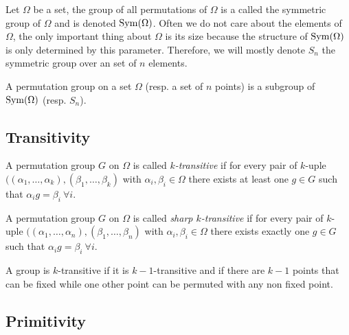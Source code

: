 \begin{definition}
  Let $\Omega$ be a set, the group of all permutations of $\Omega$ is a called the symmetric group of $\Omega$ and is denoted $\operatorname{Sym}(\Omega)$. Often we do not care about the elements of $\Omega$, the only important thing about $\Omega$ is its size because the structure of $\operatorname{Sym}(\Omega)$ is only determined by this parameter. Therefore, we will mostly denote $S_n$ the symmetric group over an set of $n$ elements.
\end{definition}

\begin{definition}
  A permutation group on a set $\Omega$ (resp. a set of $n$ points) is a subgroup of $\operatorname{Sym}(\Omega)$ (resp. $S_n$).
\end{definition}

\subsection{Transitivity}

\begin{definition}
  A permutation group $G$ on $\Omega$ is called \textit{$k$-transitive} if for every pair of $k$-uple $((\alpha_1, \dots, \alpha_k), (\beta_1, \dots, \beta_k)$ with $\alpha_i, \beta_i \in \Omega$ there exists at least one $g \in G$ such that $\alpha_i g = \beta_i \  \forall i$.
\end{definition}

\begin{definition}
  A permutation group $G$ on $\Omega$ is called \textit{sharp $k$-transitive} if for every pair of $k$-uple $((\alpha_1, \dots, \alpha_n), (\beta_1, \dots, \beta_n)$ with $\alpha_i, \beta_i \in \Omega$ there exists exactly one $g \in G$ such that $\alpha_i g = \beta_i \  \forall i$.
\end{definition}

\begin{property}
  \label{practical-transitivity}
  A group is $k$-transitive if it is $k-1$-transitive and if there are $k-1$ points that can be fixed while one other point can be permuted with any non fixed point.
\end{property}

\subsection{Primitivity}

